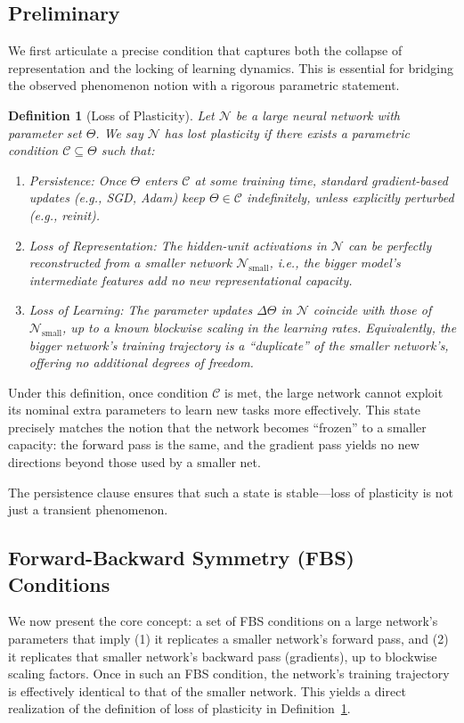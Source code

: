 \documentclass[11pt]{article}
\newtheorem{definition}{Definition}[section]
\begin{document}
\subsection{Preliminary}

We first articulate a precise condition that captures both the collapse of representation and the locking of learning dynamics. This is essential for bridging the observed phenomenon notion with a rigorous parametric statement.

\begin{definition}[Loss of Plasticity]
\label{def:loss_of_plasticity}
Let $\mathcal{N}$ be a large neural network with parameter set $\Theta$. We say $\mathcal{N}$ has lost plasticity if there exists a parametric condition $\mathcal{C} \subseteq \Theta$ such that:
\begin{enumerate}
    \item Persistence: Once $\Theta$ enters $\mathcal{C}$ at some training time, standard gradient-based updates (e.g., SGD, Adam) keep $\Theta \in \mathcal{C}$ indefinitely, unless explicitly perturbed (e.g., reinit).
    \item Loss of Representation: The hidden-unit activations in $\mathcal{N}$ can be perfectly reconstructed from a smaller network $\mathcal{N}_{\text{small}}$, i.e., the bigger model's intermediate features add no new representational capacity.
    \item Loss of Learning: The parameter updates $\Delta \Theta$ in $\mathcal{N}$ coincide with those of $\mathcal{N}_{\text{small}}$, up to a known blockwise scaling in the learning rates. Equivalently, the bigger network's training trajectory is a ``duplicate'' of the smaller network's, offering no additional degrees of freedom.
\end{enumerate}
\end{definition}

Under this definition, once condition $\mathcal{C}$ is met, the large network cannot exploit its nominal extra parameters to learn new tasks more effectively. This state precisely matches the notion that the network becomes ``frozen'' to a smaller capacity: the forward pass is the same, and the gradient pass yields no new directions beyond those used by a smaller net.

The persistence clause ensures that such a state is stable---loss of plasticity is not just a transient phenomenon.

\subsection{Forward-Backward Symmetry (FBS) Conditions}
We now present the core concept: a set of FBS conditions on a large network's parameters that imply (1) it replicates a smaller network's forward pass, and (2) it replicates that smaller network's backward pass (gradients), up to blockwise scaling factors. Once in such an FBS condition, the network's training trajectory is effectively identical to that of the smaller network. This yields a direct realization of the definition of loss of plasticity in Definition~\ref{def:loss_of_plasticity}.
\end{document}
